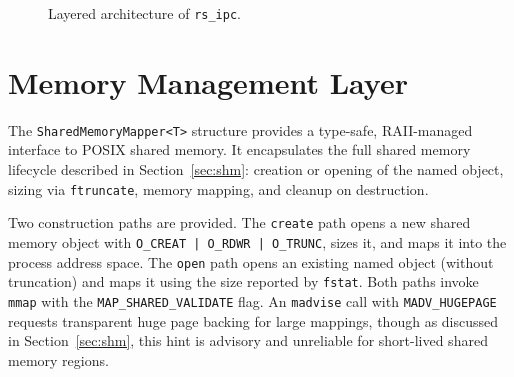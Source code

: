 \begin{figure}[htbp]
    \centering
    \caption{Layered architecture of \texttt{rs\_ipc}.}
    \label{fig:arch_layers}
\end{figure}


\newpage
\section{Memory Management Layer}
\label{sec:memory_mgmt}

The \texttt{SharedMemoryMapper<T>} structure provides a type-safe, RAII-managed interface to POSIX shared memory. It encapsulates the full shared memory lifecycle described in Section~\ref{sec:shm}: creation or opening of the named object, sizing via \texttt{ftruncate}, memory mapping, and cleanup on destruction.

Two construction paths are provided. The \texttt{create} path opens a new shared memory object with \texttt{O\_CREAT | O\_RDWR | O\_TRUNC}, sizes it, and maps it into the process address space. The \texttt{open} path opens an existing named object (without truncation) and maps it using the size reported by \texttt{fstat}. Both paths invoke \texttt{mmap} with the \texttt{MAP\_SHARED\_VALIDATE} flag. An \texttt{madvise} call with \texttt{MADV\_HUGEPAGE} requests transparent huge page backing for large mappings, though as discussed in Section~\ref{sec:shm}, this hint is advisory and unreliable for short-lived shared memory regions.

